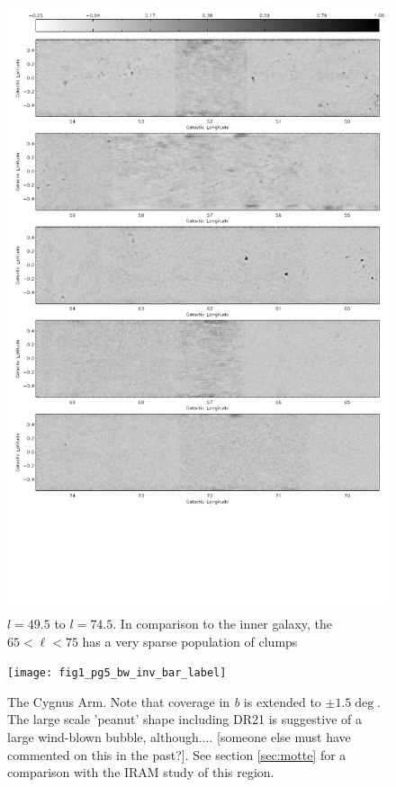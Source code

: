 \documentclass[12pt,preprint]{aastex}
\begin{document}
\begin{figure}
  \begin{minipage}{6.5in} 
    \begin{center}
      \includegraphics[scale=0.9]{fig1_pg3_bw_inv_bar_label}
      \caption{$l=49.5$ to $l=74.5$.  In comparison to the inner galaxy, the $65
      < \ell < 75$ has a very sparse population of clumps}
    \end{center}
  \end{minipage}
\end{figure}

\addtocounter{figure}{-1}
\addtocounter{subfig}{1}

\begin{figure}
  \hspace{-1in}
  \texttt{[image: fig1\_pg5\_bw\_inv\_bar\_label]} 
  \caption{The Cygnus Arm. Note that coverage in \emph{b} is extended to $\pm
  1.5\deg$. The large scale 'peanut' shape including DR21 is suggestive of a
  large wind-blown bubble, although.... [someone else must have commented on
  this in the past?].  See section \ref{sec:motte} for a comparison with the
  \citet{motte07} IRAM study of this region. }
\end{figure}
\end{document}
